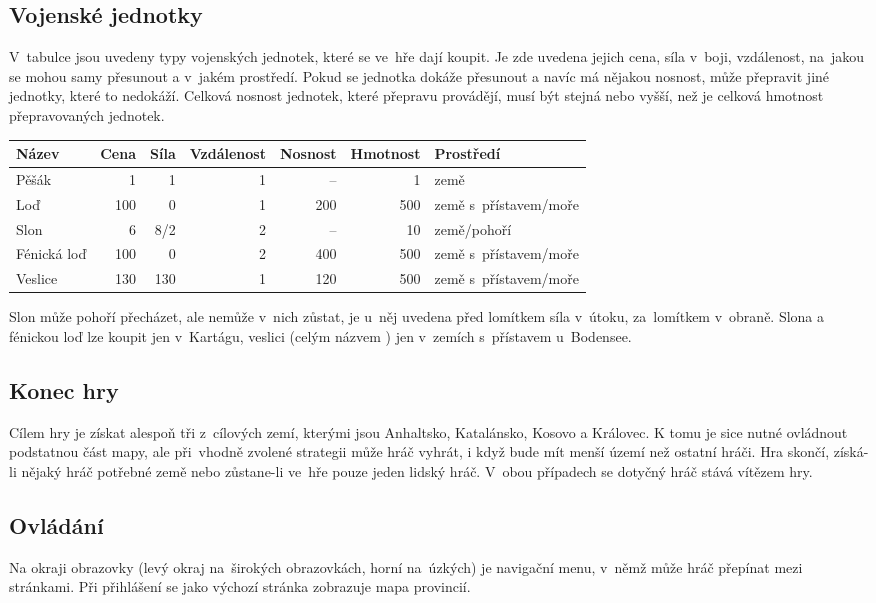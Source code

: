 \documentclass[a4paper,12pt]{article}
\begin{document}
\subsection{Vojenské jednotky}
V~tabulce jsou uvedeny typy vojenských jednotek, které se ve~hře dají koupit. Je zde uvedena jejich cena, síla v~boji, vzdálenost, na~jakou se mohou samy přesunout a v~jakém prostředí. Pokud se jednotka dokáže přesunout a navíc má nějakou nosnost, může přepravit jiné jednotky, které to nedokáží. Celková nosnost jednotek, které přepravu provádějí, musí být stejná nebo vyšší, než je celková hmotnost přepravovaných jednotek.

\begin{tabular}{l r r r r r l}
Název		& Cena	& Síla	& Vzdálenost	&Nosnost& Hmotnost	& Prostředí\\ \hline
Pěšák		& 1		& 1		& 1			& --		& 1			& země\\
Loď			& 100	& 0		& 1			& 200	& 500		& země s~přístavem/moře\\
Slon			& 6		& 8/2	& 2			& --		& 10			& země/pohoří\\
Fénická loď	& 100	& 0		& 2			& 400	& 500		& země s~přístavem/moře\\
Veslice		& 130	& 130	& 1			& 120	& 500		& země s~přístavem/moře\\
\end{tabular}

Slon může pohoří přecházet, ale nemůže v~nich zůstat, je u~něj uvedena před lomítkem síla v~útoku, za~lomítkem v~obraně. Slona a fénickou loď lze koupit jen v~Kartágu, veslici (celým názvem ) jen v~zemích s~přístavem u~Bodensee.
\subsection{Konec hry}
Cílem hry je získat alespoň tři z~cílových zemí, kterými jsou Anhaltsko, Katalánsko, Kosovo a Královec. K tomu je sice nutné ovládnout podstatnou část mapy, ale při~vhodně zvolené strategii může hráč vyhrát, i když bude mít menší území než ostatní hráči. Hra skončí, získá-li nějaký hráč potřebné země nebo zůstane-li ve~hře pouze jeden lidský hráč. V~obou případech se dotyčný hráč stává vítězem hry.
\subsection{Ovládání}
Na okraji obrazovky (levý okraj na~širokých obrazovkách, horní na~úzkých) je navigační menu, v~němž může hráč přepínat mezi stránkami. Při přihlášení se jako výchozí stránka zobrazuje mapa provincií.
\end{document}
